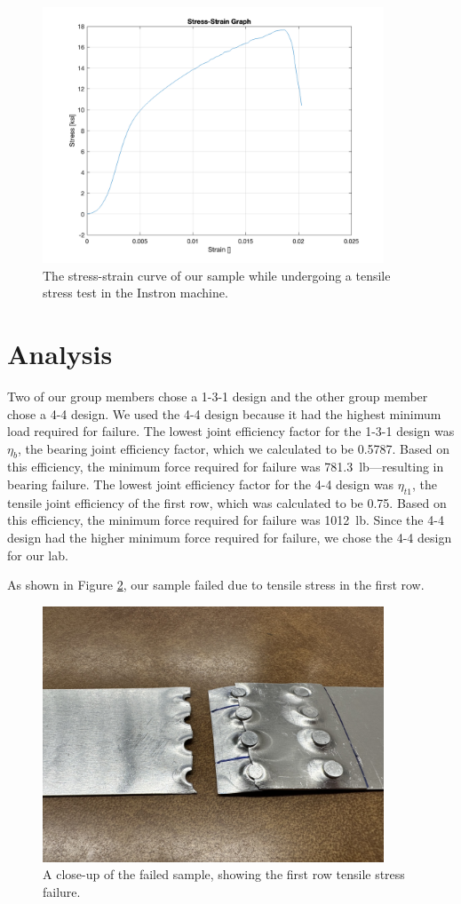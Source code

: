 \documentclass[12 pt]{article}
\begin{document}
\begin{figure}[htbp]
\centering
\includegraphics[width=4in]{images/Graphs/stress-strain}
\caption{The stress-strain curve of our sample while undergoing a tensile stress test in the Instron machine.}
\label{fig:stress-strain}
\end{figure}

\section{Analysis} \label{analysis}
Two of our group members chose a 1-3-1 design and the other group member chose a 4-4 design. We used the 4-4 design because it had the highest minimum load required for failure. The lowest joint efficiency factor for the 1-3-1 design was $\eta_b$, the bearing joint efficiency factor, which we calculated to be \num{0.5787}. Based on this efficiency, the minimum force required for failure was \qty{781.3}{lb}---resulting in bearing failure. The lowest joint efficiency factor for the 4-4 design was $\eta_{t1}$, the tensile joint efficiency of the first row, which was calculated to be \num{0.75}. Based on this efficiency, the minimum force required for failure was \qty{1012}{lb}. Since the 4-4 design had the higher minimum force required for failure, we chose the 4-4 design for our lab.

As shown in Figure \ref{fig:failed-sample}, our sample failed due to tensile stress in the first row.

\begin{figure}[htbp]
\centering
\includegraphics[width=4in]{images/failed-sample}
\caption{A close-up of the failed sample, showing the first row tensile stress failure.}
\label{fig:failed-sample}
\end{figure}
\end{document}

